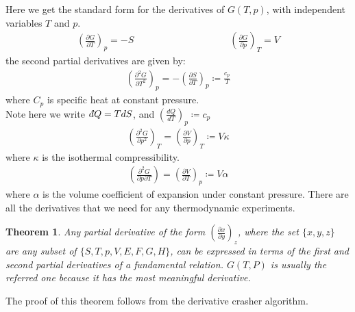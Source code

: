 \documentclass[11pt]{article}
\theoremstyle{break}
\theoremstyle{break}
\newtheorem{thm}{Theorem}[section]
\newcommand{\pd}{\partial}
\newcommand{\lr}[1]{\left( #1 \right)}
\newcommand{\dbar}{d\hspace*{-0.08em}\bar{}\hspace*{0.1em}}
\begin{document}
Here we get the standard form for the derivatives of $G(T,p)$, with independent variables $T$ and $p$.
\begin{align*}
\lr{\frac{\pd G}{\pd T}}_p = -S\qquad\qquad\qquad\qquad\qquad \lr{\frac{\pd G}{\pd p}}_T = V
\end{align*}
the second partial derivatives are given by:
\begin{align*}
\lr{\frac{\pd^2 G}{\pd T^2}}_p = -\lr{\frac{\pd S}{\pd T}}_p \coloneqq \frac{c_p}{T}
\end{align*}
where $C_p$ is specific heat at constant pressure. \\
Note here we write $\dbar Q = T dS$, and $\lr{\frac{dQ}{dT}}_p \coloneqq c_p$
\begin{align*}
\lr{\frac{\pd^2 G}{\pd p^2}}_T = \lr{\frac{\pd V}{\pd p}}_T \coloneqq V\kappa
\end{align*}
where $\kappa$ is the isothermal compressibility.\\
\begin{align*}
\lr{\frac{\pd^2 G}{\pd p \pd T}} = \lr{\frac{\pd V}{\pd T}}_p \coloneqq V\alpha
\end{align*}
where $\alpha$ is the volume coefficient of expansion under constant pressure. There are all the derivatives that we need for any thermodynamic experiments. \\

\begin{thm}
Any partial derivative of the form $\lr{\frac{\partial x}{\partial y}}_z$, where the set $\{x,y,z\}$ are any subset of $\{S,T,p,V,E,F,G,H\}$, can be expressed in terms of the first and second partial derivatives of a fundamental relation. $G(T,P)$ is usually the referred one because it has the most meaningful derivative. 
\end{thm}
The proof of this theorem follows from the derivative crasher algorithm. \\
\end{document}
